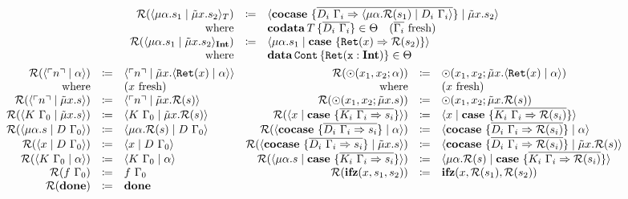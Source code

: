 \begin{gather*}
\begin{array}{rcl}
    \redundancy{\cut{\mu\alpha.s_1}{\tilde{\mu}x.s_2}_T} & \coloneq & \cut{\cocase{\overline{D_i\ \Gamma_i \Rightarrow \cut{\mu\alpha.\redundancy{s_1}}{D_i\ \Gamma_i}}}}{\tilde{\mu}x.s_2} \\
    \text{where} &  & \codata{T}{\overline{D_i\ \Gamma_i}} \in \Theta \quad \fresh{\overline{\Gamma_i}} \\
    \redundancy{\cut{\mu\alpha.s_1}{\tilde{\mu}x.s_2}_\tyint} & \coloneq & \cut{\mu\alpha.s_1}{\case{\mathtt{Ret}(x) \Rightarrow \redundancy{s_2}}} \\
    \text{where} & & \data{\mathtt{Cont}}{\mathtt{Ret(x : \tyint)}} \in \Theta \\
  \end{array}
  \\
  \begin{array}{rclrcl}
    \redundancy{\cut{\lit{n}}{\alpha}} & \coloneq & \cut{\lit{n}}{\tilde{\mu}x.\cut{\mathtt{Ret}(x)}{\alpha}} &
    \redundancy{\odot(x_1, x_2; \alpha)}{} & \coloneq & \odot(x_1, x_2; \tilde{\mu}x.\cut{\mathtt{Ret}(x)}{\alpha}) \\
    \text{where} &  & \fresh{x} &
    \text{where} &  & \fresh{x} \\
    \redundancy{\cut{\lit{n}}{\tilde{\mu}x.s}} & \coloneq & \cut{\lit{n}}{\tilde{\mu}x.\redundancy{s}} &
    \redundancy{\odot(x_1, x_2; \tilde{\mu}x.s)}{} & \coloneq & \odot(x_1, x_2; \tilde{\mu}x.\redundancy{s}) \\
    \redundancy{\cut{K\ \Gamma_0}{\tilde{\mu}x.s}} & \coloneq & \cut{K\ \Gamma_0}{\tilde{\mu}x.\redundancy{s}} &
    \redundancy{\cut{x}{\case{\overline{K_i\ \Gamma_i \Rightarrow s_i}}}} & \coloneq & \cut{x}{\case{\overline{K_i\ \Gamma_i \Rightarrow \redundancy{s_i}}}} \\
    \redundancy{\cut{\mu\alpha.s}{D\ \Gamma_0}} & \coloneq & \cut{\mu\alpha.\redundancy{s}}{D\ \Gamma_0} &
    \redundancy{\cut{\cocase{\overline{D_i\ \Gamma_i \Rightarrow s_i}}}{\alpha}} & \coloneq & \cut{\cocase{\overline{D_i\ \Gamma_i \Rightarrow \redundancy{s_i}}}}{\alpha} \\
    \redundancy{\cut{x}{D\ \Gamma_0}} & \coloneq & \cut{x}{D\ \Gamma_0} &
    \redundancy{\cut{\cocase{\overline{D_i\ \Gamma_i \Rightarrow s_i}}}{\tilde{\mu}x.s}} & \coloneq & \cut{\cocase{\overline{D_i\ \Gamma_i \Rightarrow \redundancy{s_i}}}}{\tilde{\mu}x.\redundancy{s}} \\
    \redundancy{\cut{K\ \Gamma_0}{\alpha}} & \coloneq & \cut{K\ \Gamma_0}{\alpha} &
    \redundancy{\cut{\mu\alpha.s}{\case{\overline{K_i\ \Gamma_i \Rightarrow s_i}}}} & \coloneq & \cut{\mu\alpha.\redundancy{s}}{\case{\overline{K_i\ \Gamma_i \Rightarrow \redundancy{s_i}}}} \\
    \redundancy{f\ \Gamma_0}{} & \coloneq & f\ \Gamma_0 &
    \redundancy{\ifz{x}{s_1}{s_2}}{} & \coloneq & \ifz{x}{\redundancy{s_1}}{\redundancy{s_2}} \\
    \redundancy{\done}{} & \coloneq & \done & & & \\
  \end{array}
\end{gather*}
